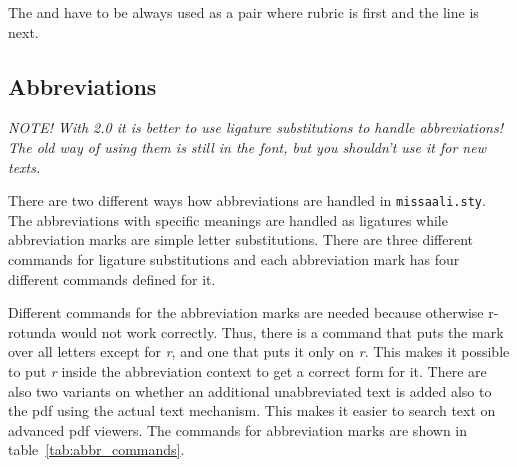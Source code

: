 \documentclass[a4paper, 12pt]{article}
\begin{document}
The  and  have to be
always used as a pair where rubric is first and the line is next.

\subsection{Abbreviations}

\emph{NOTE! With \Missaali{} 2.0 it is better to use ligature
  substitutions to handle abbreviations! The old way of using them is
  still in the font, but you shouldn't use it for new texts.}

There are two different ways how abbreviations are handled in
\texttt{missaali.sty}. The abbreviations with specific meanings are
handled as ligatures while abbreviation marks are simple letter
substitutions. There are three different commands for ligature
substitutions and each abbreviation mark has four different commands
defined for it. 

Different commands for the abbreviation marks are needed because
otherwise r-rotunda would not work correctly. Thus, there is a command
that puts the mark over all letters except for \emph{r}, and one that
puts it only on \emph{r}. This makes it possible to put \emph{r}
inside the abbreviation context to get a correct form for it. There
are also two variants on whether an additional unabbreviated text is
added also to the pdf using the actual text mechanism. This makes it
easier to search text on advanced pdf viewers. The commands for
abbreviation marks are shown in table~\ref{tab:abbr_commands}.
\end{document}
